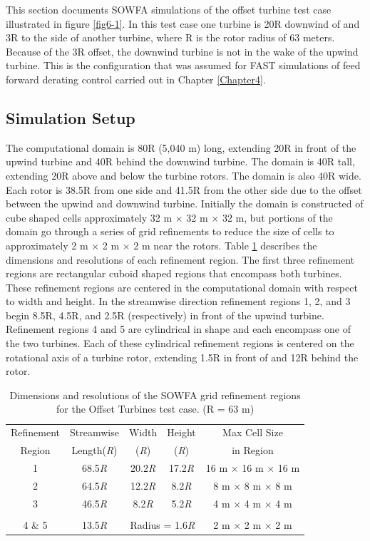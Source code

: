 This section documents SOWFA simulations of the offset turbine test case illustrated in figure \ref{fig6-1}. In this test case one turbine is 20R downwind of and 3R to the side of another turbine, where R is the rotor radius of 63 meters. Because of the 3R offset, the downwind turbine is not in the wake of the upwind turbine. This is the configuration that was assumed for FAST simulations of feed forward derating control carried out in Chapter \ref{Chapter4}. 


\subsection{Simulation Setup} \label{section6-6-1}

The computational domain is 80R (5,040 m) long, extending 20R in front of the upwind turbine and 40R behind the downwind turbine. The domain is 40R tall, extending 20R above and below the turbine rotors. The domain is also 40R wide. Each rotor is 38.5R from one side and 41.5R from the other side due to the offset between the upwind and downwind turbine. Initially the domain is constructed of cube shaped cells approximately 32 m $\times$ 32 m $\times$ 32 m, but portions of the domain go through a series of grid refinements to reduce the size of cells to approximately 2 m $\times$ 2 m $\times$ 2 m near the rotors. Table \ref{Table6-1} describes the dimensions and resolutions of each refinement region. The first three refinement regions are rectangular cuboid shaped regions that encompass both turbines. These refinement regions are centered in the computational domain with respect to width and height. In the streamwise direction refinement regions 1, 2, and 3 begin 8.5R, 4.5R, and 2.5R (respectively) in front of the upwind turbine. Refinement regions 4 and 5 are cylindrical in shape and each encompass one of the two turbines. Each of these cylindrical refinement regions is centered on the rotational axis of a turbine rotor, extending 1.5R in front of and 12R behind the rotor.


\begin{table} [ht]
\centering
\begin{tabular}{c c c c c}
\hline
Refinement & Streamwise  & Width & Height & Max Cell Size\\
Region & Length(\emph{R}) & (\emph{R})  &  (\emph{R}) & in Region\\
\hline
1 & 68.5\emph{R}  & 20.2\emph{R} & 17.2\emph{R} & 16 m $\times$ 16 m $\times$ 16 m\\
2 & 64.5\emph{R}  & 12.2\emph{R} & 8.2\emph{R}  & 8 m $\times$ 8 m $\times$ 8 m\\
3 & 46.5\emph{R}  & 8.2\emph{R} & 5.2\emph{R}  & 4 m $\times$ 4 m $\times$ 4 m\\
\\
4 \& 5 & 13.5\emph{R}    & \multicolumn{2}{c}{Radius = 1.6\emph{R}}   & 2 m $\times$ 2 m $\times$ 2 m\\
\hline
\end{tabular}
\caption{ Dimensions and resolutions of the SOWFA grid refinement regions for the Offset Turbines test case. (R = 63 m)}
\label{Table6-1}
\end{table}

